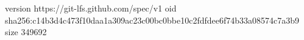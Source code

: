 version https://git-lfs.github.com/spec/v1
oid sha256:c14b3d4c473f10daa1a309ac23c00bc0bbe10c2fdfdee6f74b33a08574c7a3b9
size 349692
